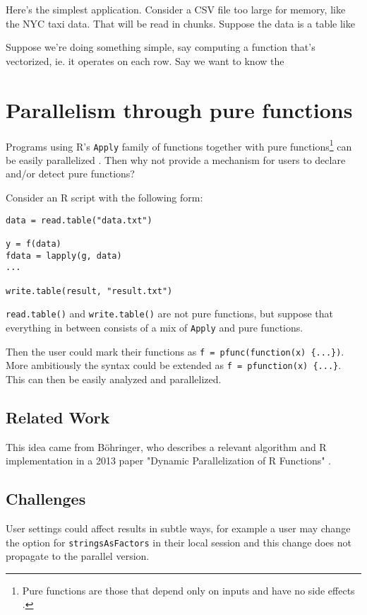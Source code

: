 \documentclass[12pt]{article}
\begin{document}
Here's the simplest application.
Consider a CSV file too large for memory, like the NYC taxi data. 
That will
be read in chunks. Suppose the data is a table like 

Suppose we're doing something simple, say computing a
function that's vectorized, ie. it operates on each row. Say we want to
know the 

\section{Parallelism through pure functions}

Programs using R's \texttt{Apply} family of functions together with pure
functions\footnote{Pure functions are those that depend only on inputs and
have no side effects \cite{wiki:purefunc}.} can be easily parallelized
\cite{bohringer2013dynamic}. Then why not provide a mechanism for users to
declare and/or detect pure functions?

Consider an R script with the following form:
\begin{verbatim}
data = read.table("data.txt")

y = f(data)
fdata = lapply(g, data)
...

write.table(result, "result.txt")
\end{verbatim}

\texttt{read.table()} and \texttt{write.table()} are not pure functions,
but suppose that everything in between consists of a mix of \texttt{Apply} and pure functions.

Then the user could mark their functions as \texttt{f = pfunc(function(x)
\{...\})}. More ambitiously the syntax could be extended as \texttt{f =
pfunction(x) \{...\}}. This can then be easily analyzed and parallelized.

\subsection{Related Work}

This idea came from Böhringer, who describes a relevant algorithm and
R implementation in a 2013 paper "Dynamic Parallelization of R Functions"
\cite{bohringer2013dynamic}.

\subsection{Challenges}

User settings could affect results in subtle ways, for example a user may
change the option for \texttt{stringsAsFactors} in their local session and
this change does not propagate to the parallel version.
\end{document}
